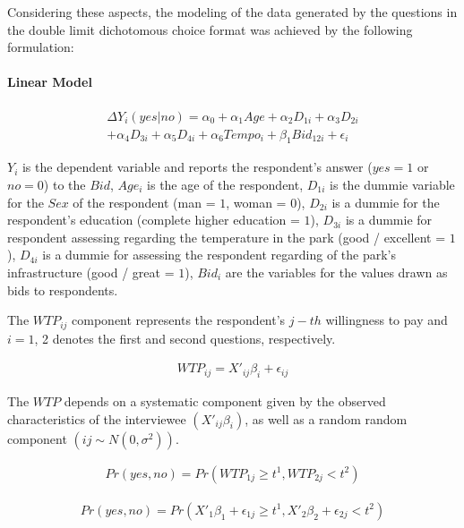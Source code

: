\documentclass[smallextended]{svjour3}       %
\begin{document}
Considering these aspects, the modeling of the data generated by the
questions in the double limit dichotomous choice format was achieved by
the following formulation:

\hypertarget{linear-model}{%
\paragraph{Linear Model}\label{linear-model}}

\[
\begin{aligned}
\Delta Y_{i}(yes|no)= \alpha_{0} + \alpha_{1}Age + \alpha_{2}D_{1i} + \alpha_{3}D_{2i} \\ 
+ \alpha_{4}D_{3i} + \alpha_{5}D_{4i} + \alpha_{6}Tempo_{i} + \beta_{1}Bid_{12i} + \epsilon_{i}     
\end{aligned}
\]

\(Y_i\) is the dependent variable and reports the respondent's answer
(\(yes = 1\) or \(no = 0\)) to the \(Bid\), \(Age_i\) is the age of the
respondent, \(D_{1i}\) is the dummie variable for the \(Sex\) of the
respondent (man = \(1\), woman = \(0\)), \(D_{2i}\) is a dummie for the
respondent's education (complete higher education = \(1\)), \(D_{3i}\)
is a dummie for respondent assessing regarding the temperature in the
park (good / excellent = \(1\)), \(D_{4i}\) is a dummie for assessing
the respondent regarding of the park's infrastructure (good / great =
\(1\)), \(Bid_i\) are the variables for the values drawn as bids to
respondents.

The \(WTP_{ij}\) component represents the respondent's \(j-th\)
willingness to pay and \(i = 1\), 2 denotes the first and second
questions, respectively.

\begin{align}
WTP_{ij} = X'_{ij}\beta_{i} + \epsilon_{ij}
\end{align}

The \(WTP\) depends on a systematic component given by the observed
characteristics of the interviewee \((X'_{ij}\beta_{i})\), as well as a
random random component \((ij \sim N(0, \sigma^2))\).

\begin{align}
Pr(yes, no) = Pr(WTP_{1j} \ge t^1, WTP_{2j} < t^2)
\end{align}

\begin{align}
Pr(yes, no) = Pr(X'_{1}\beta_{1} + \epsilon_{1j} \ge t^1, X'_{2}\beta_{2} + \epsilon_{2j} < t^2)
\end{align}
\end{document}
